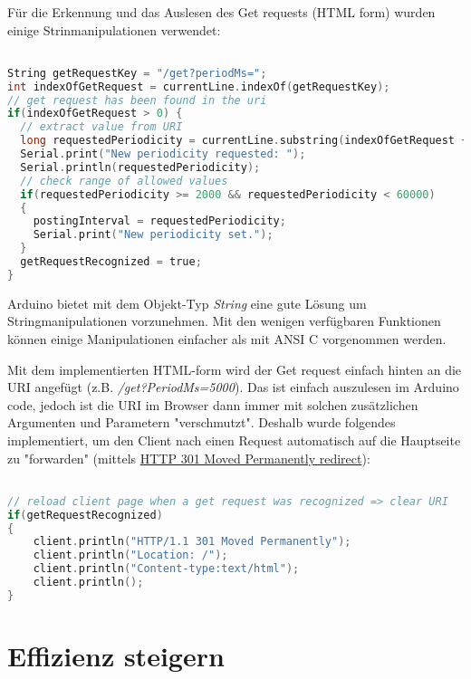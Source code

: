 \documentclass{article}
\begin{document}
Für die Erkennung und das Auslesen des Get requests (HTML form) wurden einige Strinmanipulationen verwendet:
\begin{lstlisting}[frame=single, language=C, breaklines=true]  % Start your code-block

String getRequestKey = "/get?periodMs=";
int indexOfGetRequest = currentLine.indexOf(getRequestKey);
// get request has been found in the uri
if(indexOfGetRequest > 0) {   
  // extract value from URI
  long requestedPeriodicity = currentLine.substring(indexOfGetRequest + getRequestKey.length()).toInt();  
  Serial.print("New periodicity requested: ");
  Serial.println(requestedPeriodicity);
  // check range of allowed values
  if(requestedPeriodicity >= 2000 && requestedPeriodicity < 60000)  
  {
    postingInterval = requestedPeriodicity;
    Serial.print("New periodicity set.");
  }
  getRequestRecognized = true;
}

\end{lstlisting}
Arduino bietet mit dem Objekt-Typ \textit{String} eine gute Lösung um Stringmanipulationen vorzunehmen. Mit den wenigen verfügbaren Funktionen können einige Manipulationen einfacher als mit ANSI C vorgenommen werden.

Mit dem implementierten HTML-form wird der Get request einfach hinten an die URI angefügt (z.B. \textit{/get?PeriodMs=5000}). Das ist einfach auszulesen im Arduino code, jedoch ist die URI im Browser dann immer mit solchen zusätzlichen Argumenten und Parametern "verschmutzt". Deshalb wurde folgendes implementiert, um den Client nach einen Request automatisch auf die Hauptseite zu "forwarden" (mittels \href{https://en.wikipedia.org/wiki/URL_redirection}{HTTP 301 Moved Permanently redirect}):
\begin{lstlisting}[frame=single, language=C, breaklines=true]  % Start your code-block

// reload client page when a get request was recognized => clear URI
if(getRequestRecognized)
{
    client.println("HTTP/1.1 301 Moved Permanently");
    client.println("Location: /");
    client.println("Content-type:text/html");
    client.println();
}

\end{lstlisting}



\section{Effizienz steigern}
\end{document}
